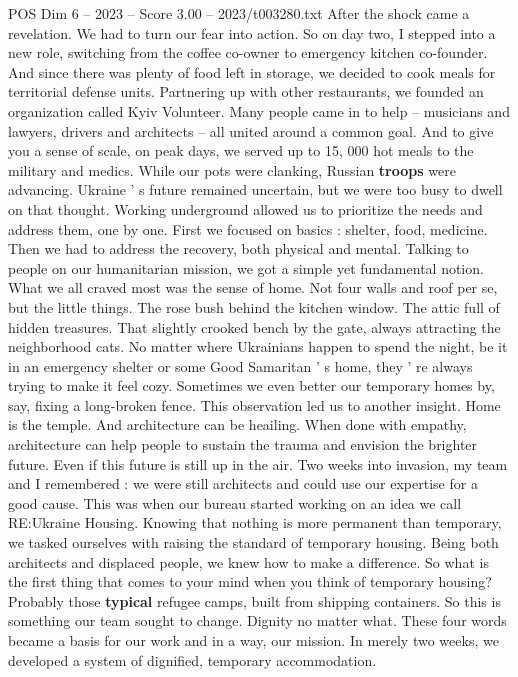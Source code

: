 \begin{textsample}{POS Dim 6 – 2023 – Score 3.00 – 2023/t003280.txt}
After the shock came a revelation.
We had to turn our fear into action.
So on day two, I stepped into a new role, switching from the coffee co-owner to emergency kitchen co-founder.
And since there was plenty of food left in storage, we decided to cook meals for territorial defense units.
Partnering up with other restaurants, we founded an organization called Kyiv Volunteer.
Many people came in to help -- musicians and lawyers, drivers and architects -- all united around a common goal.
And to give you a sense of scale, on peak days, we served up to 15, 000 hot meals to the military and medics.
While our pots were clanking, Russian \textbf{troops} were advancing.
Ukraine ' s future remained uncertain, but we were too busy to dwell on that thought.
Working underground allowed us to prioritize the needs and address them, one by one.
First we focused on basics : shelter, food, medicine.
Then we had to address the recovery, both physical and mental.
Talking to people on our humanitarian mission, we got a simple yet fundamental notion.
What we all craved most was the sense of home.
Not four walls and roof per se, but the little things.
The rose bush behind the kitchen window.
The attic full of hidden treasures.
That slightly crooked bench by the gate, always attracting the neighborhood cats.
No matter where Ukrainians happen to spend the night, be it in an emergency shelter or some Good Samaritan ' s home, they ' re always trying to make it feel cozy.
Sometimes we even better our temporary homes by, say, fixing a long-broken fence.
This observation led us to another insight.
Home is the temple.
And architecture can be heailing.
When done with empathy, architecture can help people to sustain the trauma and envision the brighter future.
Even if this future is still up in the air.
Two weeks into invasion, my team and I remembered : we were still architects and could use our expertise for a good cause.
This was when our bureau started working on an idea we call RE:Ukraine Housing.
Knowing that nothing is more permanent than temporary, we tasked ourselves with raising the standard of temporary housing.
Being both architects and displaced people, we knew how to make a difference.
So what is the first thing that comes to your mind when you think of temporary housing?
Probably those \textbf{typical} refugee camps, built from shipping containers.
So this is something our team sought to change.
Dignity no matter what.
These four words became a basis for our work and in a way, our mission.
In merely two weeks, we developed a system of dignified, temporary accommodation.

\end{textsample}
